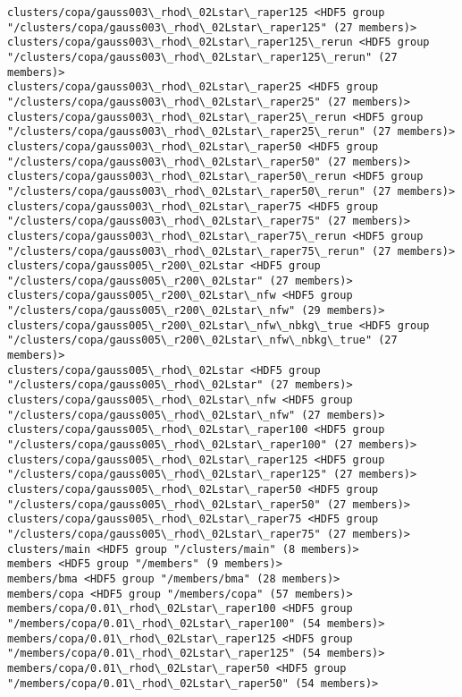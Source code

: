 \documentclass[11pt]{article}
\begin{document}
\begin{Verbatim}[commandchars=\\\{\}]
clusters/copa/gauss003\_rhod\_02Lstar\_raper125 <HDF5 group "/clusters/copa/gauss003\_rhod\_02Lstar\_raper125" (27 members)>
clusters/copa/gauss003\_rhod\_02Lstar\_raper125\_rerun <HDF5 group "/clusters/copa/gauss003\_rhod\_02Lstar\_raper125\_rerun" (27 members)>
clusters/copa/gauss003\_rhod\_02Lstar\_raper25 <HDF5 group "/clusters/copa/gauss003\_rhod\_02Lstar\_raper25" (27 members)>
clusters/copa/gauss003\_rhod\_02Lstar\_raper25\_rerun <HDF5 group "/clusters/copa/gauss003\_rhod\_02Lstar\_raper25\_rerun" (27 members)>
clusters/copa/gauss003\_rhod\_02Lstar\_raper50 <HDF5 group "/clusters/copa/gauss003\_rhod\_02Lstar\_raper50" (27 members)>
clusters/copa/gauss003\_rhod\_02Lstar\_raper50\_rerun <HDF5 group "/clusters/copa/gauss003\_rhod\_02Lstar\_raper50\_rerun" (27 members)>
clusters/copa/gauss003\_rhod\_02Lstar\_raper75 <HDF5 group "/clusters/copa/gauss003\_rhod\_02Lstar\_raper75" (27 members)>
clusters/copa/gauss003\_rhod\_02Lstar\_raper75\_rerun <HDF5 group "/clusters/copa/gauss003\_rhod\_02Lstar\_raper75\_rerun" (27 members)>
clusters/copa/gauss005\_r200\_02Lstar <HDF5 group "/clusters/copa/gauss005\_r200\_02Lstar" (27 members)>
clusters/copa/gauss005\_r200\_02Lstar\_nfw <HDF5 group "/clusters/copa/gauss005\_r200\_02Lstar\_nfw" (29 members)>
clusters/copa/gauss005\_r200\_02Lstar\_nfw\_nbkg\_true <HDF5 group "/clusters/copa/gauss005\_r200\_02Lstar\_nfw\_nbkg\_true" (27 members)>
clusters/copa/gauss005\_rhod\_02Lstar <HDF5 group "/clusters/copa/gauss005\_rhod\_02Lstar" (27 members)>
clusters/copa/gauss005\_rhod\_02Lstar\_nfw <HDF5 group "/clusters/copa/gauss005\_rhod\_02Lstar\_nfw" (27 members)>
clusters/copa/gauss005\_rhod\_02Lstar\_raper100 <HDF5 group "/clusters/copa/gauss005\_rhod\_02Lstar\_raper100" (27 members)>
clusters/copa/gauss005\_rhod\_02Lstar\_raper125 <HDF5 group "/clusters/copa/gauss005\_rhod\_02Lstar\_raper125" (27 members)>
clusters/copa/gauss005\_rhod\_02Lstar\_raper50 <HDF5 group "/clusters/copa/gauss005\_rhod\_02Lstar\_raper50" (27 members)>
clusters/copa/gauss005\_rhod\_02Lstar\_raper75 <HDF5 group "/clusters/copa/gauss005\_rhod\_02Lstar\_raper75" (27 members)>
clusters/main <HDF5 group "/clusters/main" (8 members)>
members <HDF5 group "/members" (9 members)>
members/bma <HDF5 group "/members/bma" (28 members)>
members/copa <HDF5 group "/members/copa" (57 members)>
members/copa/0.01\_rhod\_02Lstar\_raper100 <HDF5 group "/members/copa/0.01\_rhod\_02Lstar\_raper100" (54 members)>
members/copa/0.01\_rhod\_02Lstar\_raper125 <HDF5 group "/members/copa/0.01\_rhod\_02Lstar\_raper125" (54 members)>
members/copa/0.01\_rhod\_02Lstar\_raper50 <HDF5 group "/members/copa/0.01\_rhod\_02Lstar\_raper50" (54 members)>

\end{Verbatim}
\end{document}
